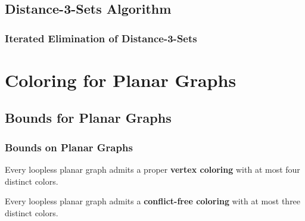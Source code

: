 \documentclass[xcolor=dvipsnames,aspectratio=1610]{beamer}
\begin{document}
  \subsection{Distance-3-Sets Algorithm}

  \begin{frame}
    \frametitle{Iterated Elimination of Distance-3-Sets}

    

  \end{frame}


  \section{Coloring for Planar Graphs}

  \subsection{Bounds for Planar Graphs}
  \begin{frame}
    \frametitle{Bounds on Planar Graphs}


    \begin{theorem}
    Every loopless planar graph admits a proper \textbf{vertex coloring} with at most {\color{red} four} distinct colors.
    \end{theorem}

    \pause

    \begin{theorem}
    Every loopless planar graph admits a \textbf{conflict-free coloring} with at most {\color{red} three} distinct colors.
    \end{theorem}

  \end{frame}
\end{document}
